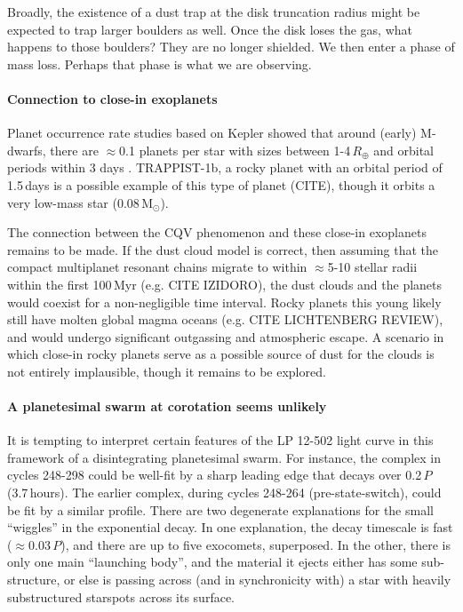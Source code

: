 \documentclass[11pt,twocolumn,tighten]{aastex63}
\begin{document}
Broadly, the existence of a dust trap at the disk truncation radius 
might be expected to trap larger boulders as well.
Once the disk loses the gas, what happens to those boulders?
They are no longer shielded.
We then enter a phase of mass loss.
Perhaps that phase is what we are observing.


\paragraph{Connection to close-in exoplanets}
Planet occurrence rate studies based on Kepler showed that around
(early) M-dwarfs, there are $\approx$0.1 planets per star with sizes
between 1-4\,$R_\oplus$ and orbital periods within 3 days
\citep{2015ApJ...807...45D}.
TRAPPIST-1b, a rocky planet with an orbital period of 1.5\,days is a
possible example of this type of planet (CITE), though it orbits a
very low-mass star (0.08\,M$_\odot$).

The connection between the CQV phenomenon and these close-in
exoplanets remains to be made.
If the dust cloud model is correct, then assuming that the
compact multiplanet resonant chains migrate to within $\approx$5-10
stellar radii within the first 100\,Myr (e.g. CITE IZIDORO), the
dust clouds and the planets would coexist for a non-negligible time
interval.
Rocky planets this young likely still have molten global magma oceans
(e.g. CITE LICHTENBERG REVIEW), and would undergo significant 
outgassing and atmospheric escape.
A scenario in which close-in rocky planets serve as a possible source
of dust for the clouds is not entirely implausible, though it remains
to be explored.


\paragraph{A planetesimal swarm at corotation seems unlikely}
It is tempting to interpret certain features of the LP 12-502 light
curve in this framework of a disintegrating planetesimal swarm.  For
instance, the complex in cycles 248-298 could be well-fit by a sharp
leading edge that decays over 0.2\,$P$ (3.7\,hours).  The earlier
complex, during cycles 248-264 (pre-state-switch), could be fit by a
similar profile.  There are two degenerate explanations for the small
``wiggles'' in the exponential decay.  In one explanation, the decay
timescale is fast ($\approx$0.03\,$P$), and there are up to five
exocomets, superposed.  In the other, there is only one main
``launching body'', and the material it ejects either has some
sub-structure, or else is passing across (and in synchronicity with) a
star with heavily substructured starspots across its surface.
\end{document}

